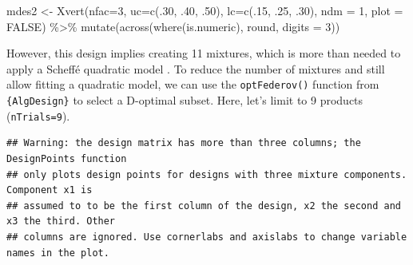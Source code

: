 \documentclass[
]{krantz}
\makeatletter
\newenvironment{Shaded}{\begin{snugshade}}{\end{snugshade}}
\newcommand{\AttributeTok}[1]{\textcolor[rgb]{0.61,0.61,0.61}{#1}}
\newcommand{\ConstantTok}[1]{\textcolor[rgb]{0,0,0}{#1}}
\newcommand{\DecValTok}[1]{\textcolor[rgb]{0.06,0.06,0.06}{#1}}
\newcommand{\FunctionTok}[1]{\textcolor[rgb]{0,0,0}{#1}}
\newcommand{\NormalTok}[1]{#1}
\newcommand{\OtherTok}[1]{\textcolor[rgb]{0.37,0.37,0.37}{#1}}
\newcommand{\SpecialCharTok}[1]{\textcolor[rgb]{0,0,0}{#1}}
\newcommand{\StringTok}[1]{\textcolor[rgb]{0.5,0.5,0.5}{#1}}
\newenvironment{kframe}{%
\medskip{}
\setlength{\fboxsep}{.8em}
 \def\at@end@of@kframe{}%
 \ifinner\ifhmode%
  \def\at@end@of@kframe{\end{minipage}}%
  \begin{minipage}{\columnwidth}%
 \fi\fi%
 \def\FrameCommand##1{\hskip\@totalleftmargin \hskip-\fboxsep
 \colorbox{shadecolor}{##1}\hskip-\fboxsep
     \hskip-\linewidth \hskip-\@totalleftmargin \hskip\columnwidth}%
 \MakeFramed {\advance\hsize-\width
   \@totalleftmargin\z@ \linewidth\hsize
   \@setminipage}}%
 {\par\unskip\endMakeFramed%
 \at@end@of@kframe}
\renewenvironment{Shaded}{\begin{kframe}}{\end{kframe}}
\makeatother
\begin{document}
\begin{Shaded}
\begin{Highlighting}[]
\NormalTok{mdes2 }\OtherTok{\textless{}{-}} \FunctionTok{Xvert}\NormalTok{(}\AttributeTok{nfac=}\DecValTok{3}\NormalTok{, }\AttributeTok{uc=}\FunctionTok{c}\NormalTok{(.}\DecValTok{30}\NormalTok{, .}\DecValTok{40}\NormalTok{, .}\DecValTok{50}\NormalTok{), }\AttributeTok{lc=}\FunctionTok{c}\NormalTok{(.}\DecValTok{15}\NormalTok{, .}\DecValTok{25}\NormalTok{, .}\DecValTok{30}\NormalTok{), }\AttributeTok{ndm =} \DecValTok{1}\NormalTok{, }\AttributeTok{plot =} \ConstantTok{FALSE}\NormalTok{) }\SpecialCharTok{\%\textgreater{}\%} 
      \FunctionTok{mutate}\NormalTok{(}\FunctionTok{across}\NormalTok{(}\FunctionTok{where}\NormalTok{(is.numeric), round, }\AttributeTok{digits =} \DecValTok{3}\NormalTok{))}
\end{Highlighting}
\end{Shaded}

However, this design implies creating 11 mixtures, which is more than needed to apply a Scheffé quadratic model \citep{Lawson2016}. To reduce the number of mixtures and still allow fitting a quadratic model, we can use the \texttt{optFederov()} function from \texttt{\{AlgDesign\}} to select a D-optimal subset. Here, let's limit to 9 products (\texttt{nTrials=9}).

\begin{Shaded}
\end{Shaded}

\begin{verbatim}
## Warning: the design matrix has more than three columns; the DesignPoints function  
## only plots design points for designs with three mixture components. Component x1 is 
## assumed to to be the first column of the design, x2 the second and x3 the third. Other 
## columns are ignored. Use cornerlabs and axislabs to change variable names in the plot.
\end{verbatim}
\end{document}
